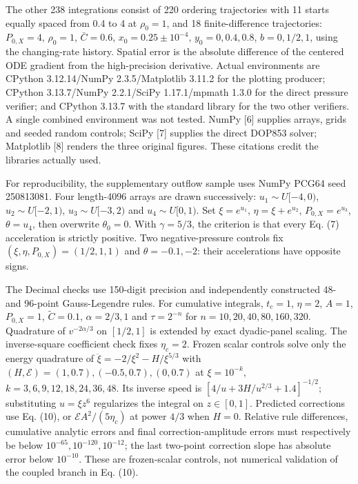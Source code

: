 The other 238 integrations consist of 220 ordering trajectories with 11
starts equally spaced from 0.4 to 4 at \(\rho_0=1\), and 18
finite-difference trajectories: \(P_{0,X}=4\), \(\rho_0=1\),
\(\bar C=0.6\), \(x_0=0.25\pm10^{-4}\), \(y_0=0,0.4,0.8\),
\(b=0,1/2,1\), using the changing-rate history. Spatial error is the
absolute difference of the centered ODE gradient from the high-precision
derivative. Actual environments are CPython 3.12.14/NumPy
2.3.5/Matplotlib 3.11.2 for the plotting producer; CPython 3.13.7/NumPy
2.2.1/SciPy 1.17.1/mpmath 1.3.0 for the direct pressure verifier; and
CPython 3.13.7 with the standard library for the two other verifiers. A
single combined environment was not tested. NumPy {[}6{]} supplies
arrays, grids and seeded random controls; SciPy {[}7{]} supplies the
direct DOP853 solver; Matplotlib {[}8{]} renders the three original
figures. These citations credit the libraries actually used.

For reproducibility, the supplementary outflow sample uses NumPy PCG64
seed 250813081. Four length-4096 arrays are drawn successively:
\(u_1\sim U[-4,0)\), \(u_2\sim U[-2,1)\), \(u_3\sim U[-3,2)\) and
\(u_4\sim U[0,1)\). Set \(\xi=e^{u_1}\), \(\eta=\xi+e^{u_2}\),
\(P_{0,X}=e^{u_3}\), \(\theta=u_4\), then overwrite \(\theta_0=0\). With
\(\gamma=5/3\), the criterion is that every Eq. (7) acceleration is
strictly positive. Two negative-pressure controls fix
\((\xi,\eta,P_{0,X})=(1/2,1,1)\) and \(\theta=-0.1,-2\): their
accelerations have opposite signs.

The Decimal checks use 150-digit precision and independently constructed
48- and 96-point Gauss-Legendre rules. For cumulative integrals,
\(t_c=1\), \(\eta=2\), \(A=1\), \(P_{0,X}=1\), \(\widetilde C=0.1\),
\(\alpha=2/3,1\) and \(\tau=2^{-n}\) for \(n=10,20,40,80,160,320\).
Quadrature of \(v^{-2\alpha/3}\) on \([1/2,1]\) is extended by exact
dyadic-panel scaling. The inverse-square coefficient check fixes
\(\eta_c=2\). Frozen scalar controls solve only the energy quadrature of
\(\ddot\xi=-2/\xi^2-H/\xi^{5/3}\) with
\((H,\mathcal E)=(1,0.7),(-0.5,0.7),(0,0.7)\) at \(\xi=10^{-k}\),
\(k=3,6,9,12,18,24,36,48\). Its inverse speed is
\([4/u+3H/u^{2/3}+1.4]^{-1/2}\); substituting \(u=\xi z^6\) regularizes
the integral on \(z\in[0,1]\). Predicted corrections use Eq. (10), or
\(\mathcal E A^2/(5\eta_c)\) at power \(4/3\) when \(H=0\). Relative
rule differences, cumulative analytic errors and final
correction-amplitude errors must respectively be below
\(10^{-65},10^{-120},10^{-12}\); the last two-point correction slope has
absolute error below \(10^{-10}\). These are frozen-scalar controls, not
numerical validation of the coupled branch in Eq. (10).

